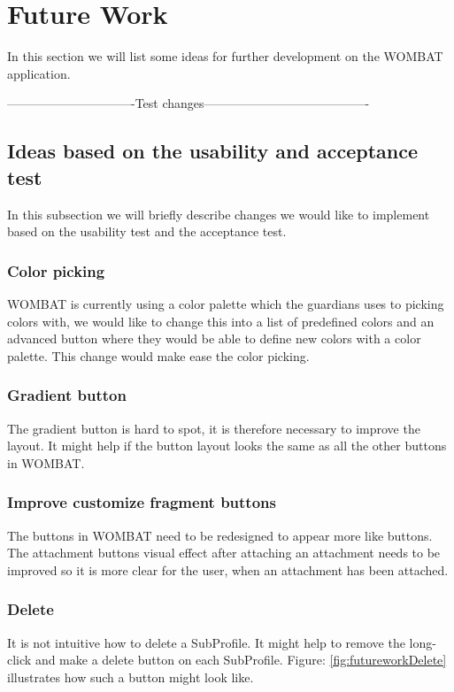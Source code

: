 \section{Future Work}
In this section we will list some ideas for further development on the WOMBAT application.

-------------------------------Test changes----------------------------------------
\subsection{Ideas based on the usability and acceptance test}
In this subsection we will briefly describe changes we would like to implement based on the usability test and the acceptance test.

\subsubsection{Color picking}
WOMBAT is currently using a color palette which the guardians uses to picking colors with, we would like to change this into a list of predefined colors and an advanced button where they would be able to define new colors with a color palette. This change would make ease the color picking.

\subsubsection{Gradient button}
The gradient button is hard to spot, it is therefore necessary to improve the layout. It might help if the button layout looks the same as all the other buttons in WOMBAT.

\subsubsection{Improve customize fragment buttons}
The buttons in WOMBAT need to be redesigned to appear more like buttons. The attachment buttons visual effect after attaching an attachment needs to be improved so it is more clear for the user, when an attachment has been attached.

\subsubsection{Delete}
It is not intuitive how to delete a SubProfile. It might help to remove the long-click and make a delete button on each SubProfile. Figure: \ref{fig:futureworkDelete} illustrates how such a button might look like.


